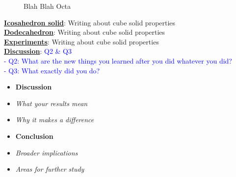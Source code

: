 \begin{center}
\begin{figure}[h]
\hfill
{}
\caption{Blah Blah Octa}
\end{figure}
\end{center}

\noindent\uline{\textbf{Icosahedron solid}}:
Writing about cube solid properties\\

\noindent\uline{\textbf{Dodecahedron}}:
Writing about cube solid properties\\


\noindent\uline{\textbf{Experiments}}:
Writing about cube solid properties\\

\noindent\uline{\textbf{Discussion}}: 
\textcolor{blue}{Q2 \& Q3\\
- Q2: What are the new things you learned after you did whatever you did?\\
- Q3: What exactly did you do?}\\

\begin{itemize}
\color{red}
\item \textbf{Discussion}
\item \textit{What your results mean}
\item \textit{Why it makes a difference}
\item \textbf{Conclusion}
\item \textit{Broader implications}
\item \textit{Areas for further study}
\end{itemize}





